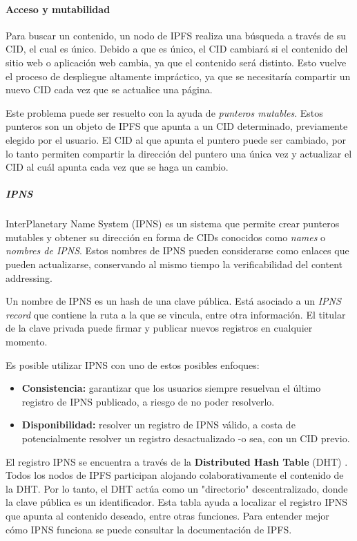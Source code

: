 \paragraph{Acceso y mutabilidad}

Para buscar un contenido, un nodo de IPFS realiza una búsqueda a través de su CID, el cual es único. Debido a que es único, el CID cambiará si el contenido del sitio web o aplicación web cambia, ya que el contenido será distinto. Esto vuelve el proceso de despliegue altamente impráctico, ya que se necesitaría compartir un nuevo CID cada vez que se actualice una página.

Este problema puede ser resuelto con la ayuda de \textit{punteros mutables}. Estos punteros son un objeto de IPFS que apunta a un CID determinado, previamente elegido por el usuario. El CID al que apunta el puntero puede ser cambiado, por lo tanto permiten compartir la dirección del puntero una única vez y actualizar el CID al cuál apunta cada vez que se haga un cambio.

\subparagraph{IPNS}

InterPlanetary Name System (IPNS) \cite{ipns} es un sistema que permite crear  punteros mutables y obtener su dirección en forma de CIDs conocidos como \textit{names} o \textit{nombres de IPNS}. Estos nombres de IPNS pueden considerarse como enlaces que pueden actualizarse, conservando al mismo tiempo la verificabilidad del content addressing.

Un nombre de IPNS es un hash de una \cite{ipns-hash} clave pública. Está asociado a un \textit{IPNS record} \cite{ipns-record} que contiene la ruta a la que se vincula, entre otra información. El titular de la clave privada puede firmar y publicar nuevos registros en cualquier momento.

Es posible utilizar IPNS con uno de estos posibles enfoques:
\begin{itemize}
    \item \textbf{Consistencia:} garantizar que los usuarios siempre resuelvan el último registro de IPNS publicado, a riesgo de no poder resolverlo.
    \item \textbf{Disponibilidad:} resolver un registro de IPNS válido, a costa de potencialmente resolver un registro desactualizado -o sea, con un CID previo.
\end{itemize}

El registro IPNS se encuentra a través de la \textbf{Distributed Hash Table} (DHT) \cite{dht}. Todos los nodos de IPFS participan alojando colaborativamente el contenido de la DHT. Por lo tanto, el DHT actúa como un "directorio" descentralizado, donde la clave pública es un identificador. Esta tabla ayuda a localizar el registro IPNS que apunta al contenido deseado, entre otras funciones. Para entender mejor cómo IPNS funciona se puede consultar la documentación de IPFS.

